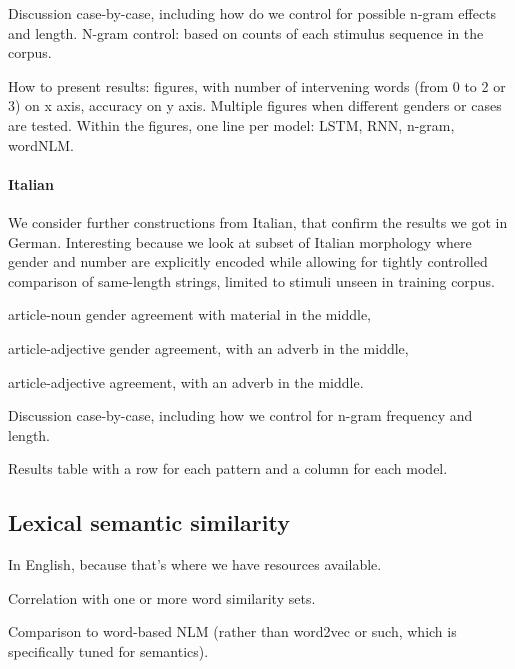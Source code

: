 Discussion case-by-case, including how do we control for possible
n-gram effects and length. N-gram control: based on counts of each
stimulus sequence in the corpus.

How to present results: figures, with number of intervening words
(from 0 to 2 or 3) on x axis, accuracy on y axis. Multiple figures
when different genders or cases are tested. Within the figures, one
line per model: LSTM, RNN, n-gram, wordNLM.

\paragraph{Italian} We consider further constructions from Italian,
that confirm the results we got in German. Interesting because we look
at subset of Italian morphology where gender and number are explicitly
encoded while allowing for tightly controlled comparison of
same-length strings, limited to stimuli unseen in training corpus.
\begin{inparaenum}[i)]
\item article-noun gender agreement with material in the middle,
\item article-adjective gender agreement, with an adverb in the middle,
\item article-adjective  agreement, with an adverb in the middle.
\end{inparaenum}

Discussion case-by-case, including how we control for n-gram frequency
and length.

Results table with a row for each pattern and a column for each model.


\subsection{Lexical semantic similarity}
\label{sec:similarity}

In English, because that's where we have resources available.

Correlation with one or more word similarity sets.

Comparison to word-based NLM (rather than word2vec or such, which is
specifically tuned for semantics).

